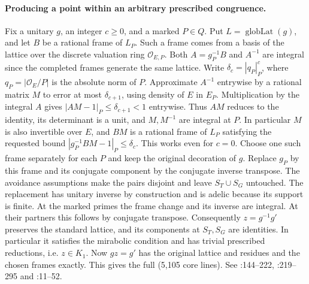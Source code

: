 \paragraph{Producing a point within an arbitrary prescribed congruence.}\label{r13:s9-congruence}
Fix a unitary $g$, an integer $c\ge 0$, and a marked $P\in Q$. Put
$L=\operatorname{globLat}(g)$, and let $B$ be a rational frame of
$L_P$. Such a frame comes from a basis of the lattice over the discrete
valuation ring $\mathcal O_{E,P}$.
Both $A=g_P^{-1}B$ and $A^{-1}$ are integral since the completed
frames generate the same lattice. Write $\delta_c=|q_P|_P^c$,
where $q_P=|\mathcal O_E/P|$ is the absolute norm of $P$. Approximate $A^{-1}$
entrywise by a rational matrix $M$ to error at most $\delta_{c+1}$,
using density of $E$ in $E_P$. Multiplication by the integral $A$
gives $|AM-1|_P\le\delta_{c+1}<1$ entrywise. Thus $AM$ reduces
to the identity, its determinant is a unit, and $M,M^{-1}$ are integral
at $P$. In particular $M$ is also invertible over $E$, and $B M$
is a rational frame of $L_P$ satisfying the requested bound
$|g_P^{-1}B M-1|_P\le\delta_c$. This works even for $c=0$.
Choose one such frame separately for each $P$ and keep the original
decoration of $g$. Replace $g_P$ by this frame and its conjugate
component by the conjugate inverse transpose. The avoidance assumptions
make the pairs disjoint and leave $S_T\cup S_G$ untouched. The replacement
has unitary inverse by construction and is adelic because its support
is finite. At the marked primes the frame change and its inverse are
integral. At their partners this follows by conjugate transpose.
Consequently $z=g^{-1}g'$ preserves the standard lattice, and its
components at $S_T,S_G$ are identities. In particular it satisfies
the mirabolic condition and has trivial prescribed reductions, i.e.
$z\in K_1$. Now $g z=g'$ has the original lattice and residues and
the chosen frames exactly. This gives the full
 (5,105 core lines).
See :144--222,
:219--295 and :11--52.

